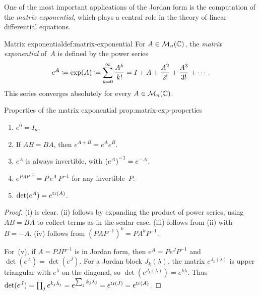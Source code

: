 One of the most important applications of the Jordan form is the
computation of the \emph{matrix exponential}, which plays a central
role in the theory of linear differential equations.

\begin{definition}{Matrix exponential}{def:matrix-exponential}
For $A \in \mathcal{M}_n({\mathbb{C}})$, the \emph{matrix exponential} of~$A$ is
defined by the power series
\[
  e^A \coloneqq \exp(A) \coloneqq \sum_{k=0}^{\infty} \frac{A^k}{k!}
  = I + A + \frac{A^2}{2!} + \frac{A^3}{3!} + \cdots.
\]
This series converges absolutely for every $A \in \mathcal{M}_n({\mathbb{C}})$.
\end{definition}

\begin{proposition}{Properties of the matrix exponential}%
{prop:matrix-exp-properties}
\begin{enumerate}[label=(\roman*)]
  \item $e^{0} = I_n$.
  \item If $AB = BA$, then $e^{A+B} = e^A e^B$.
  \item $e^A$ is always invertible, with ${(e^A)}^{-1} = e^{-A}$.
  \item $e^{PAP^{-1}} = P\,e^A\,P^{-1}$ for any invertible~$P$.
  \item $\det(e^A) = e^{\operatorname{tr}(A)}$.
\end{enumerate}
\end{proposition}

\begin{proof}
(i) is clear.  (ii) follows by expanding the product of power series,
using $AB = BA$ to collect terms as in the scalar case.  (iii) follows
from (ii) with $B = -A$.  (iv) follows from
$(PAP^{-1})^k = PA^kP^{-1}$.

For~(v), if $A = PJP^{-1}$ is in Jordan form, then $e^A = Pe^JP^{-1}$
and $\det(e^A) = \det(e^J)$.  For a Jordan block $J_k(\lambda)$,
the matrix $e^{J_k(\lambda)}$ is upper triangular with $e^\lambda$ on
the diagonal, so $\det(e^{J_k(\lambda)}) = e^{k\lambda}$.
Thus $\det(e^J) = \prod_j e^{k_j\lambda_j} = e^{\sum_j k_j\lambda_j}
= e^{\operatorname{tr}(J)} = e^{\operatorname{tr}(A)}$.
\end{proof}

